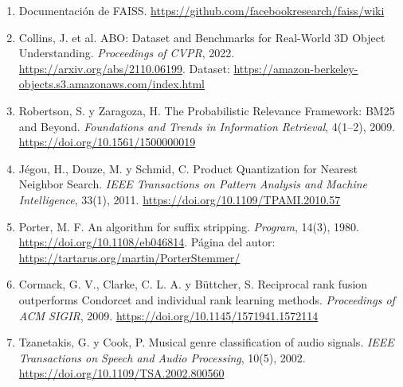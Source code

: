 \documentclass[11pt,a4paper]{article}
\begin{document}
\begin{enumerate}
  \item Documentación de FAISS. \url{https://github.com/facebookresearch/faiss/wiki}
  \item Collins, J. et al. ABO: Dataset and Benchmarks for Real-World 3D Object Understanding. \emph{Proceedings of CVPR}, 2022. \url{https://arxiv.org/abs/2110.06199}. Dataset: \url{https://amazon-berkeley-objects.s3.amazonaws.com/index.html}
  \item Robertson, S. y Zaragoza, H. The Probabilistic Relevance Framework: BM25 and Beyond. \emph{Foundations and Trends in Information Retrieval}, 4(1--2), 2009. \url{https://doi.org/10.1561/1500000019}
  \item Jégou, H., Douze, M. y Schmid, C. Product Quantization for Nearest Neighbor Search. \emph{IEEE Transactions on Pattern Analysis and Machine Intelligence}, 33(1), 2011. \url{https://doi.org/10.1109/TPAMI.2010.57}
  \item Porter, M. F. An algorithm for suffix stripping. \emph{Program}, 14(3), 1980. \url{https://doi.org/10.1108/eb046814}. Página del autor: \url{https://tartarus.org/martin/PorterStemmer/}
  \item Cormack, G. V., Clarke, C. L. A. y Büttcher, S. Reciprocal rank fusion outperforms Condorcet and individual rank learning methods. \emph{Proceedings of ACM SIGIR}, 2009. \url{https://doi.org/10.1145/1571941.1572114}
  \item Tzanetakis, G. y Cook, P. Musical genre classification of audio signals. \emph{IEEE Transactions on Speech and Audio Processing}, 10(5), 2002. \url{https://doi.org/10.1109/TSA.2002.800560}
\end{enumerate}
\end{document}
